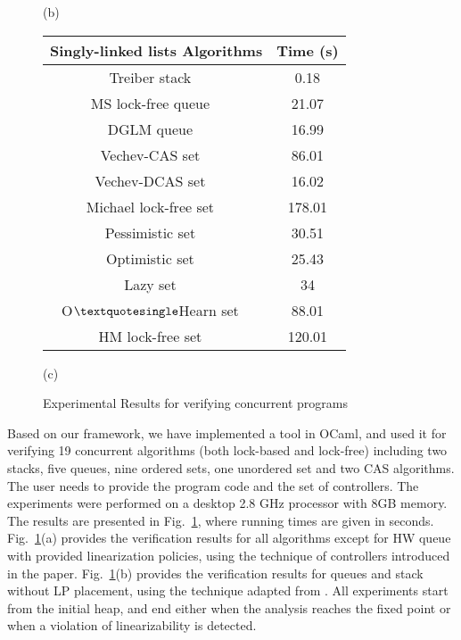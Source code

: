 \begin{figure}[]
(b)
\\
\vspace*{0.5cm}


\begin{tabular}{|c | c | }
  \hline
   \textsf{\textbf{{Singly-linked lists Algorithms}}} &  \textsf{\textbf{{Time (s)}}} \\
\hline
\textsf{Treiber stack  ~\cite{Treiber:stack}}\;\;\;\;\;\; & \textsf {0.18} \\
\hline
\textsf{MS lock-free queue  ~\cite{MS:QueueAlgorithms}}& \textsf{21.07} \\
\hline
\textsf{DGLM queue  ~\cite{Doherty:lockfree}}&  \textsf {16.99} \\
\hline
\textsf{Vechev-CAS set  ~\cite{Vechev:list}}  & \textsf{86.01} \\
\hline
\textsf{Vechev-DCAS set  ~\cite{Vechev:list}}   & \textsf{16.02}  \\
\hline
\textsf{Michael lock-free set ~\cite{Michael:list}}  & \textsf{178.01}  \\
\hline
\textsf{Pessimistic set  ~\cite{ArtOfMpP}}&\textsf{30.51} \\
\hline
\textsf{Optimistic set ~\cite{ArtOfMpP}}& \textsf{25.43} \\
\hline
\textsf{Lazy set ~\cite{Lazyset}  }  & \textsf {34} \\
\hline
\textsf {O$\textquotesingle $Hearn set  ~\cite{OHearnlist}}     & \textsf{88.01} \\
\hline
\textsf{HM lock-free set  ~\cite{ArtOfMpP} } & \textsf{120.01} \\
\hline
\end{tabular}


\vspace*{0.1cm}

(c)
\\
\caption{Experimental Results for verifying concurrent programs}
\label{Experiments:fig}
\end{figure}
Based on our framework, we have implemented a tool in OCaml, and used
it for
verifying 19 concurrent algorithms (both lock-based and lock-free)
including two stacks, 
five queues, nine ordered sets, one unordered set and two CAS algorithms. 
%
The user needs to provide the program code and the 
set of controllers.
%
The experiments were performed on a desktop 2.8 GHz processor with 8GB memory.
The results are presented in Fig.~\ref{Experiments:fig},
where running times are given in seconds. 
Fig.~\ref{Experiments:fig}(a) provides the verification
results for all algorithms except for HW queue with provided 
linearization policies, using the technique of controllers introduced in 
the paper. Fig.~\ref{Experiments:fig}(b) provides the verification
results for queues and stack without LP placement, using the technique 
adapted from \cite{BEEH:icalp15,HSV:concur13}.
%
All experiments start from the initial heap,  
and end either when the analysis 
reaches the fixed point or when a violation of linearizability is detected. 

